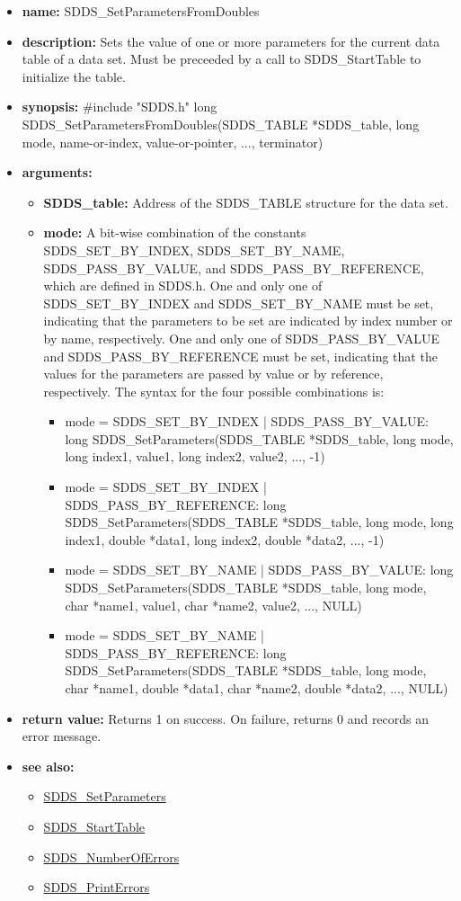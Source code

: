 \documentclass[11pt]{article}
\newcommand{\progref}[1]{\hyperref{SDDS_#1}{{\tt SDDS\_#1} (}{)}{SDDS_#1}}
\begin{document}
\begin{itemize}
\item {\bf name:}\newline
SDDS\_SetParametersFromDoubles
\item {\bf description:}\newline
Sets the value of one or more parameters for the current data table of a data set. Must be preceeded by a call to SDDS\_StartTable to initialize the table.
\item {\bf synopsis:} \#include "SDDS.h"\newline
long SDDS\_SetParametersFromDoubles(SDDS\_TABLE *SDDS\_table, long mode,  name-or-index,  value-or-pointer, ...,  terminator)
\item {\bf arguments:}
\begin{itemize}
\item {\bf SDDS\_table:} Address of the SDDS\_TABLE structure for the data set.
\item {\bf mode:} A bit-wise combination of the constants SDDS\_SET\_BY\_INDEX, SDDS\_SET\_BY\_NAME, SDDS\_PASS\_BY\_VALUE, and SDDS\_PASS\_BY\_REFERENCE, which are defined in  SDDS.h. One and only one of SDDS\_SET\_BY\_INDEX and SDDS\_SET\_BY\_NAME must be set, indicating that the parameters to be set are indicated by index number or by name, respectively. One and only one of SDDS\_PASS\_BY\_VALUE and SDDS\_PASS\_BY\_REFERENCE must be set, indicating that the values for the parameters are passed by value or by reference, respectively. The syntax for the four possible combinations is:
\begin{itemize}
\item mode = SDDS\_SET\_BY\_INDEX | SDDS\_PASS\_BY\_VALUE: long SDDS\_SetParameters(SDDS\_TABLE *SDDS\_table, long mode, long index1,  value1, long index2,  value2, ..., -1)
\item mode = SDDS\_SET\_BY\_INDEX | SDDS\_PASS\_BY\_REFERENCE: long SDDS\_SetParameters(SDDS\_TABLE *SDDS\_table, long mode, long index1, double *data1, long index2, double *data2, ..., -1)
\item mode = SDDS\_SET\_BY\_NAME | SDDS\_PASS\_BY\_VALUE: long SDDS\_SetParameters(SDDS\_TABLE *SDDS\_table, long mode, char *name1,  value1, char *name2,  value2, ..., NULL)
\item mode = SDDS\_SET\_BY\_NAME | SDDS\_PASS\_BY\_REFERENCE: long SDDS\_SetParameters(SDDS\_TABLE *SDDS\_table, long mode, char *name1, double *data1, char *name2, double *data2, ..., NULL)  
\end{itemize}
\end{itemize}
\item {\bf return value:}\newline
Returns 1 on success. On failure, returns 0 and records an error message.
\item {\bf see also:}
\begin{itemize}
\item \progref{SetParameters}
\item \progref{StartTable}
\item \progref{NumberOfErrors}
\item \progref{PrintErrors}
\end{itemize}
\end{itemize}
\end{document}
